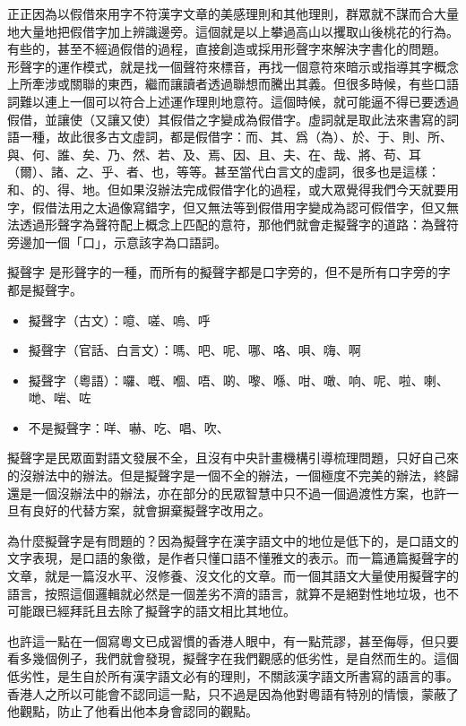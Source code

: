 \documentclass[a5paper, 10pt, openany]{book} %
\begin{document}
正正因為以假借來用字不符漢字文章的美感理則和其他理則，群眾就不謀而合大量地大量地把假借字加上辨識邊旁。這個就是以上攀過高山以攫取山後桃花的行為。有些的，甚至不經過假借的過程，直接創造或採用形聲字來解決字書化的問題。 形聲字的運作模式，就是找一個聲符來標音，再找一個意符來暗示或指導其字概念上所牽涉或關聯的東西，繼而讓讀者透過聯想而騰出其義。但很多時候，有些口語詞難以連上一個可以符合上述運作理則地意符。這個時候，就可能逼不得已要透過假借，並讓使（又讓又使）其假借之字變成為假借字。虛詞就是取此法來書寫的詞語一種，故此很多古文虛詞，都是假借字：而、其、爲（為）、於、于、則、所、與、何、誰、矣、乃、然、若、及、焉、因、且、夫、在、哉、將、苟、耳（爾）、諸、之、乎、者、也，等等。甚至當代白言文的虛詞，很多也是這樣：和、的、得、地。但如果沒辦法完成假借字化的過程，或大眾覺得我們今天就要用字，假借法用之太過像寫錯字，但又無法等到假借用字變成為認可假借字，但又無法透過形聲字為聲符配上概念上匹配的意符，那他們就會走擬聲字的道路：為聲符旁邊加一個「口」，示意該字為口語詞。

擬聲字 是形聲字的一種，而所有的擬聲字都是口字旁的，但不是所有口字旁的字都是擬聲字。

\begin{itemize}
  \item 擬聲字（古文）：噫、嗟、嗚、呼
  \item 擬聲字（官話、白言文）：嗎、吧、呢、哪、咯、唄、嗨、啊
  \item 擬聲字（粵語）：囉、嘅、嗰、唔、啲、嚟、喺、咁、噉、响、呢、啦、喇、哋、啱、咗
  \item 不是擬聲字：咩、嚇、吃、唱、吹、
    
\end{itemize}

擬聲字是民眾面對語文發展不全，且沒有中央計畫機構引導梳理問題，只好自己來的沒辦法中的辦法。但是擬聲字是一個不全的辦法，一個極度不完美的辦法，終歸還是一個沒辦法中的辦法，亦在部分的民眾智慧中只不過一個過渡性方案，也許一旦有良好的代替方案，就會摒棄擬聲字改用之。

為什麼擬聲字是有問題的？因為擬聲字在漢字語文中的地位是低下的，是口語文的文字表現，是口語的象徵，是作者只懂口語不懂雅文的表示。而一篇通篇擬聲字的文章，就是一篇沒水平、沒修養、沒文化的文章。而一個其語文大量使用擬聲字的語言，按照這個邏輯就必然是一個差劣不濟的語言，就算不是絕對性地垃圾，也不可能跟已經拜託且去除了擬聲字的語文相比其地位。

也許這一點在一個寫粵文已成習慣的香港人眼中，有一點荒謬，甚至侮辱，但只要看多幾個例子，我們就會發現，擬聲字在我們觀感的低劣性，是自然而生的。這個低劣性，是生自於所有漢字語文必有的理則，不關該漢字語文所書寫的語言的事。香港人之所以可能會不認同這一點，只不過是因為他對粵語有特別的情懷，蒙蔽了他觀點，防止了他看出他本身會認同的觀點。
\end{document}

